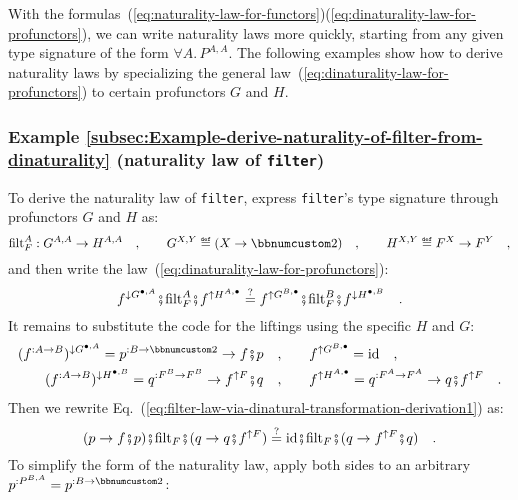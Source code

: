 With the formulas~(\ref{eq:naturality-law-for-functors})\textendash (\ref{eq:dinaturality-law-for-profunctors}),
we can write naturality laws more quickly, starting from any given
type signature of the form $\forall A.\,P^{A,A}$. The following examples
show how to derive naturality laws by specializing the general law~(\ref{eq:dinaturality-law-for-profunctors})
to certain profunctors $G$ and $H$.

\subsubsection{Example \label{subsec:Example-derive-naturality-of-filter-from-dinaturality}\ref{subsec:Example-derive-naturality-of-filter-from-dinaturality}
(naturality law of \lstinline!filter!)}

To derive the naturality law of \lstinline!filter!, express \lstinline!filter!\textsf{'}s
type signature through profunctors $G$ and $H$ as:
\[
\text{filt}_{F}^{A}:G^{A,A}\rightarrow H^{A,A}\quad,\quad\quad G^{X,Y}\triangleq(X\rightarrow\bbnum 2)\quad,\quad\quad H^{X,Y}\triangleq F^{X}\rightarrow F^{Y}\quad,
\]
and then write the law~(\ref{eq:dinaturality-law-for-profunctors}):
\begin{equation}
f^{\downarrow G^{\bullet,A}}\bef\text{filt}_{F}^{A}\bef f^{\uparrow H^{A,\bullet}}\overset{?}{=}f^{\uparrow G^{B,\bullet}}\bef\text{filt}_{F}^{B}\bef f^{\downarrow H^{\bullet,B}}\quad.\label{eq:filter-law-via-dinatural-transformation-derivation1}
\end{equation}
It remains to substitute the code for the liftings using the specific
$H$ and $G$:
\begin{align*}
(f^{:A\rightarrow B})^{\downarrow G^{\bullet,A}}=p^{:B\rightarrow\bbnum 2}\rightarrow f\bef p\quad, & \quad\quad f^{\uparrow G^{B,\bullet}}=\text{id}\quad,\\
(f^{:A\rightarrow B})^{\downarrow H^{\bullet,B}}=q^{:F^{B}\rightarrow F^{B}}\rightarrow f^{\uparrow F}\bef q\quad, & \quad\quad f^{\uparrow H^{A,\bullet}}=q^{:F^{A}\rightarrow F^{A}}\rightarrow q\bef f^{\uparrow F}\quad.
\end{align*}
Then we rewrite Eq.~(\ref{eq:filter-law-via-dinatural-transformation-derivation1})
as:
\[
(p\rightarrow f\bef p)\bef\text{filt}_{F}\bef(q\rightarrow q\bef f^{\uparrow F})\overset{?}{=}\text{id}\bef\text{filt}_{F}\bef(q\rightarrow f^{\uparrow F}\bef q)\quad.
\]
To simplify the form of the naturality law, apply both sides to an
arbitrary $p^{:P^{B,A}}=p^{:B\rightarrow\bbnum 2}$:
